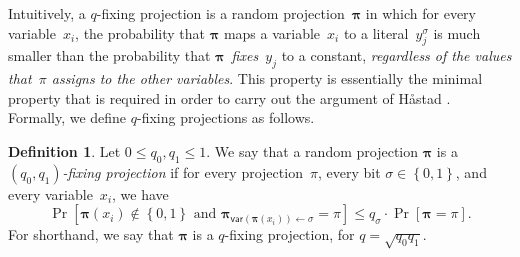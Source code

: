 \documentclass[11pt]{article}
\numberwithin{equation}{section}
\theoremstyle{definition}
\newtheorem{definition}[theorem]{Definition}
\theoremstyle{plain}
\theoremstyle{definition}\newtheorem{notation}[theorem]{Notation}\theoremstyle{plain}
\newcommand{\B}{\left\{ 0,1 \right \}}
\newcommand{\p}{\boldsymbol{\pi}}
\newcommand{\var}{\mathsf{var}}
\theoremstyle{definition}
\theoremstyle{plain}
\begin{document}
Intuitively, a $q$-fixing projection is a random projection~$\p$
in which for every variable~$x_{i}$, the probability that $\p$
maps a variable~$x_{i}$ to a literal~$y_{j}^{\sigma}$ is much
smaller than the probability that $\p$~\emph{fixes~}$y_{j}$ to
a constant, \emph{regardless of the values that~$\pi$ assigns to
the other variables}. This property is essentially the minimal property
that is required in order to carry out the argument of H{\aa}stad
\cite{H98}. Formally, we define $q$-fixing projections as follows. 
\begin{definition}
\label{def:fixing-projections}Let $0\le q_{0},q_{1}\le1$. We say that
a random projection $\p$ is a \emph{$(q_{0},q_{1})$-fixing projection}
if for every projection~$\pi$, every bit $\sigma\in\B$, and every
variable~$x_{i}$, we have 
\begin{equation}
\Pr\!\left[\p(x_{i})\notin\B\text{ and }\p_{\var(\p(x_{i}))\gets\sigma}=\pi\right]\le q_{\sigma}\cdot\Pr\!\left[\p=\pi\right].\label{eq:fixing-projection}
\end{equation}
For shorthand, we say that $\p$ is a $q$-fixing projection, for
$q=\sqrt{q_{0}q_{1}}$. 
\end{definition}
\end{document}
